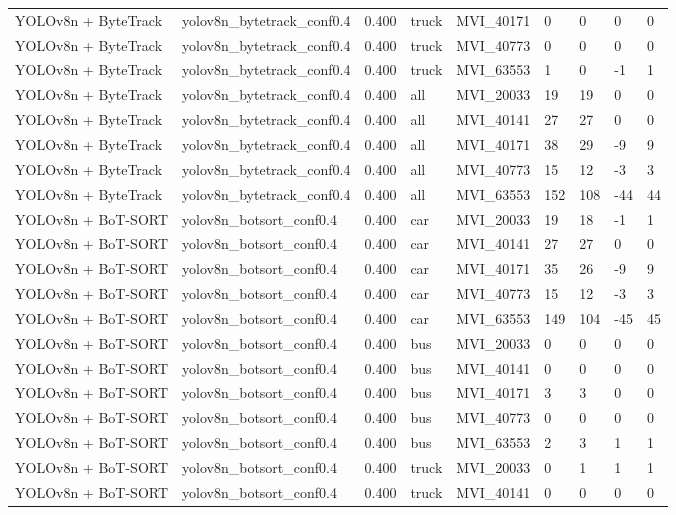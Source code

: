 \begin{tabular}{lllllllll}
YOLOv8n + ByteTrack & yolov8n\_bytetrack\_conf0.4 & 0.400 & truck & MVI\_40171 & 0 & 0 & 0 & 0 \\
YOLOv8n + ByteTrack & yolov8n\_bytetrack\_conf0.4 & 0.400 & truck & MVI\_40773 & 0 & 0 & 0 & 0 \\
YOLOv8n + ByteTrack & yolov8n\_bytetrack\_conf0.4 & 0.400 & truck & MVI\_63553 & 1 & 0 & -1 & 1 \\
YOLOv8n + ByteTrack & yolov8n\_bytetrack\_conf0.4 & 0.400 & all & MVI\_20033 & 19 & 19 & 0 & 0 \\
YOLOv8n + ByteTrack & yolov8n\_bytetrack\_conf0.4 & 0.400 & all & MVI\_40141 & 27 & 27 & 0 & 0 \\
YOLOv8n + ByteTrack & yolov8n\_bytetrack\_conf0.4 & 0.400 & all & MVI\_40171 & 38 & 29 & -9 & 9 \\
YOLOv8n + ByteTrack & yolov8n\_bytetrack\_conf0.4 & 0.400 & all & MVI\_40773 & 15 & 12 & -3 & 3 \\
YOLOv8n + ByteTrack & yolov8n\_bytetrack\_conf0.4 & 0.400 & all & MVI\_63553 & 152 & 108 & -44 & 44 \\
YOLOv8n + BoT-SORT & yolov8n\_botsort\_conf0.4 & 0.400 & car & MVI\_20033 & 19 & 18 & -1 & 1 \\
YOLOv8n + BoT-SORT & yolov8n\_botsort\_conf0.4 & 0.400 & car & MVI\_40141 & 27 & 27 & 0 & 0 \\
YOLOv8n + BoT-SORT & yolov8n\_botsort\_conf0.4 & 0.400 & car & MVI\_40171 & 35 & 26 & -9 & 9 \\
YOLOv8n + BoT-SORT & yolov8n\_botsort\_conf0.4 & 0.400 & car & MVI\_40773 & 15 & 12 & -3 & 3 \\
YOLOv8n + BoT-SORT & yolov8n\_botsort\_conf0.4 & 0.400 & car & MVI\_63553 & 149 & 104 & -45 & 45 \\
YOLOv8n + BoT-SORT & yolov8n\_botsort\_conf0.4 & 0.400 & bus & MVI\_20033 & 0 & 0 & 0 & 0 \\
YOLOv8n + BoT-SORT & yolov8n\_botsort\_conf0.4 & 0.400 & bus & MVI\_40141 & 0 & 0 & 0 & 0 \\
YOLOv8n + BoT-SORT & yolov8n\_botsort\_conf0.4 & 0.400 & bus & MVI\_40171 & 3 & 3 & 0 & 0 \\
YOLOv8n + BoT-SORT & yolov8n\_botsort\_conf0.4 & 0.400 & bus & MVI\_40773 & 0 & 0 & 0 & 0 \\
YOLOv8n + BoT-SORT & yolov8n\_botsort\_conf0.4 & 0.400 & bus & MVI\_63553 & 2 & 3 & 1 & 1 \\
YOLOv8n + BoT-SORT & yolov8n\_botsort\_conf0.4 & 0.400 & truck & MVI\_20033 & 0 & 1 & 1 & 1 \\
YOLOv8n + BoT-SORT & yolov8n\_botsort\_conf0.4 & 0.400 & truck & MVI\_40141 & 0 & 0 & 0 & 0 \\

\end{tabular}
